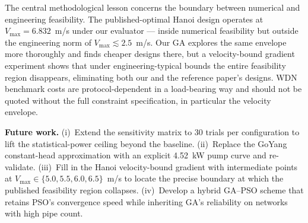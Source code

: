 \documentclass[conference]{IEEEtran}
\begin{document}
The central methodological lesson concerns the boundary between numerical and engineering feasibility. The published-optimal Hanoi design operates at $V_{\max}=6.832$~m/s under our evaluator --- inside numerical feasibility but outside the engineering norm of $V_{\max}\lesssim 2.5$~m/s. Our GA explores the same envelope more thoroughly and finds cheaper designs there, but a velocity-bound gradient experiment shows that under engineering-typical bounds the entire feasibility region disappears, eliminating both our and the reference paper's designs. WDN benchmark costs are protocol-dependent in a load-bearing way and should not be quoted without the full constraint specification, in particular the velocity envelope.

\textbf{Future work.} (i)~Extend the sensitivity matrix to 30 trials per configuration to lift the statistical-power ceiling beyond the baseline. (ii)~Replace the GoYang constant-head approximation with an explicit 4.52~kW pump curve and re-validate. (iii)~Fill in the Hanoi velocity-bound gradient with intermediate points at $V_{\max}\in\{5.0,5.5,6.0,6.5\}$~m/s to locate the precise boundary at which the published feasibility region collapses. (iv)~Develop a hybrid GA--PSO scheme that retains PSO's convergence speed while inheriting GA's reliability on networks with high pipe count.
\end{document}
